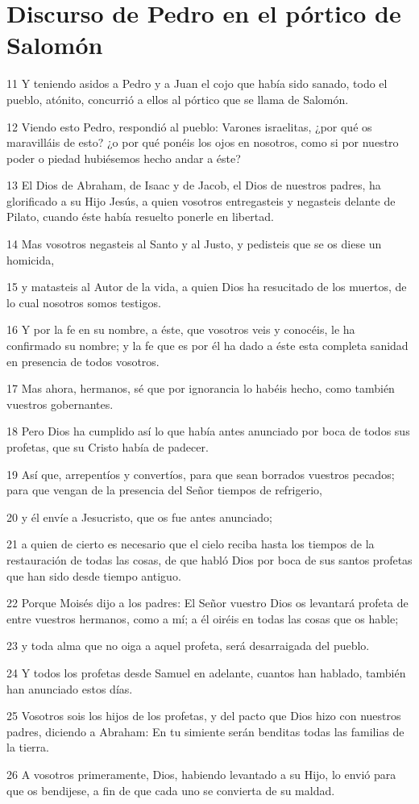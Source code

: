 \section*{Discurso de Pedro en el pórtico de Salomón}

\par 11 Y teniendo asidos a Pedro y a Juan el cojo que había sido sanado, todo el pueblo, atónito, concurrió a ellos al pórtico que se llama de Salomón.
\par 12 Viendo esto Pedro, respondió al pueblo: Varones israelitas, ¿por qué os maravilláis de esto? ¿o por qué ponéis los ojos en nosotros, como si por nuestro poder o piedad hubiésemos hecho andar a éste?
\par 13 El Dios de Abraham, de Isaac y de Jacob, el Dios de nuestros padres, ha glorificado a su Hijo Jesús, a quien vosotros entregasteis y negasteis delante de Pilato, cuando éste había resuelto ponerle en libertad.
\par 14 Mas vosotros negasteis al Santo y al Justo, y pedisteis que se os diese un homicida,
\par 15 y matasteis al Autor de la vida, a quien Dios ha resucitado de los muertos, de lo cual nosotros somos testigos.
\par 16 Y por la fe en su nombre, a éste, que vosotros veis y conocéis, le ha confirmado su nombre; y la fe que es por él ha dado a éste esta completa sanidad en presencia de todos vosotros.
\par 17 Mas ahora, hermanos, sé que por ignorancia lo habéis hecho, como también vuestros gobernantes.
\par 18 Pero Dios ha cumplido así lo que había antes anunciado por boca de todos sus profetas, que su Cristo había de padecer.
\par 19 Así que, arrepentíos y convertíos, para que sean borrados vuestros pecados; para que vengan de la presencia del Señor tiempos de refrigerio,
\par 20 y él envíe a Jesucristo, que os fue antes anunciado;
\par 21 a quien de cierto es necesario que el cielo reciba hasta los tiempos de la restauración de todas las cosas, de que habló Dios por boca de sus santos profetas que han sido desde tiempo antiguo.
\par 22 Porque Moisés dijo a los padres: El Señor vuestro Dios os levantará profeta de entre vuestros hermanos, como a mí; a él oiréis en todas las cosas que os hable;
\par 23 y toda alma que no oiga a aquel profeta, será desarraigada del pueblo.
\par 24 Y todos los profetas desde Samuel en adelante, cuantos han hablado, también han anunciado estos días.
\par 25 Vosotros sois los hijos de los profetas, y del pacto que Dios hizo con nuestros padres, diciendo a Abraham: En tu simiente serán benditas todas las familias de la tierra.
\par 26 A vosotros primeramente, Dios, habiendo levantado a su Hijo, lo envió para que os bendijese, a fin de que cada uno se convierta de su maldad.

